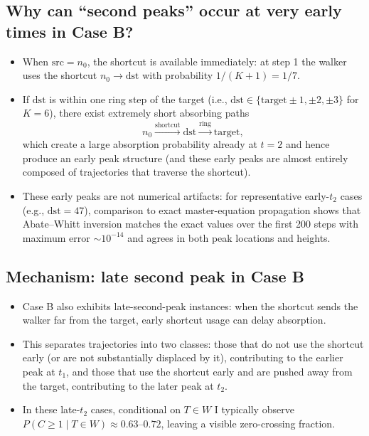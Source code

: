 \documentclass[11pt]{article}
\begin{document}
\subsection{Why can ``second peaks'' occur at very early times in Case B?}
\begin{itemize}
  \item When $\mathrm{src}=n_0$, the shortcut is available immediately: at step 1 the walker uses the shortcut $n_0\to \mathrm{dst}$ with probability $1/(K+1)=1/7$.
  \item If $\mathrm{dst}$ is within one ring step of the target (i.e., $\mathrm{dst}\in\{\mathrm{target}\pm1,\pm2,\pm3\}$ for $K=6$), there exist extremely short absorbing paths
  \[
    n_0 \xrightarrow{\text{shortcut}} \mathrm{dst} \xrightarrow{\text{ring}} \mathrm{target},
  \]
  which create a large absorption probability already at $t=2$ and hence produce an early peak structure (and these early peaks are almost entirely composed of trajectories that traverse the shortcut).
  \item These early peaks are not numerical artifacts: for representative early-$t_2$ cases (e.g., $\mathrm{dst}=47$), comparison to exact master-equation propagation shows that Abate--Whitt inversion matches the exact values over the first 200 steps with maximum error $\sim 10^{-14}$ and agrees in both peak locations and heights.
\end{itemize}

\subsection{Mechanism: late second peak in Case B}
\begin{itemize}
  \item Case B also exhibits late-second-peak instances: when the shortcut sends the walker far from the target, early shortcut usage can delay absorption.
  \item This separates trajectories into two classes: those that do not use the shortcut early (or are not substantially displaced by it), contributing to the earlier peak at $t_1$, and those that use the shortcut early and are pushed away from the target, contributing to the later peak at $t_2$.
  \item In these late-$t_2$ cases, conditional on $T\in W$ I typically observe $P(C\ge1\mid T\in W)\approx 0.63$--$0.72$, leaving a visible zero-crossing fraction.
\end{itemize}

\FloatBarrier
\end{document}
